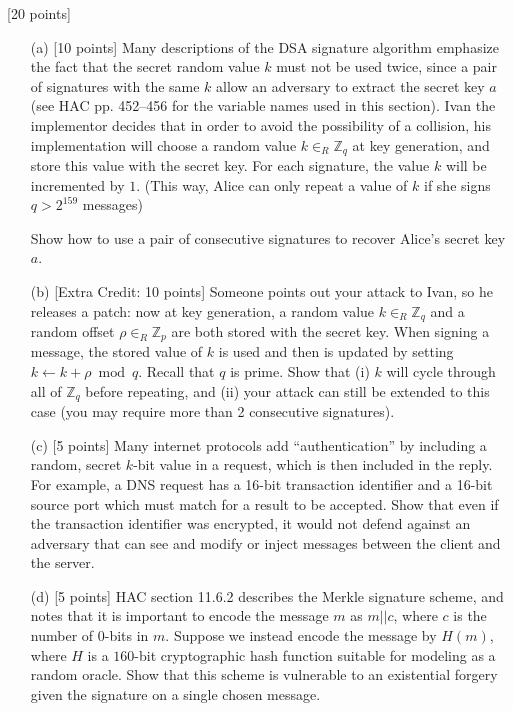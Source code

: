 \documentclass[11pt]{article}
\newcounter{qnum}
\newcommand{\question}[1]{\stepcounter{qnum}\bigskip\noindent{\bf \arabic{qnum}. #1.}}
\begin{document}
\question{Forged in the fires of CSELabs\dots} [20 points]
\begin{itemize}
\item[(a)] [10 points] Many descriptions of the DSA signature algorithm emphasize
  the fact that the secret random value $k$ must not be used twice,
  since a pair of signatures with the same $k$ allow an adversary to
  extract the secret key $a$  (see HAC pp. 452--456 for the variable
  names used in this section).  Ivan the implementor decides that in
  order to avoid the possibility of a collision, his implementation
  will choose a random value $k \in_R \mathbb{Z}_q$ at key generation,
  and store this value with the secret key.  For each signature, the
  value $k$ will be incremented by $1$.  (This way, Alice can only
  repeat a value of $k$ if she signs $q > 2^{159}$ messages)

  Show how to use a pair of consecutive signatures to recover Alice's
  secret key $a$.

\item[(b)] [Extra Credit: 10 points] Someone points out your attack to
  Ivan, so he releases a patch: now at key generation, a random value
  $k \in_R \mathbb{Z}_q$ and a random offset $\rho \in_R \mathbb{Z}_p$
  are both stored with the secret key.  When signing a message, the
  stored value of $k$ is used and then is updated by setting $k \gets
  k + \rho \bmod q$.  Recall that $q$ is prime.  Show that (i) $k$
  will cycle through all of $\mathbb{Z}_q$ before repeating, and (ii)
  your attack can still be extended to this case (you may require more
  than 2 consecutive signatures).

\item[(c)] [5 points] Many internet protocols add ``authentication''
  by including a random, secret $k$-bit value in a request, which is
  then included in the reply.  For example, a DNS request has a 16-bit
  transaction identifier and a 16-bit source port which must match for
  a result to be accepted.  Show that even if the transaction identifier was
  encrypted, it would not defend against an adversary that can see and
  modify or inject messages between the client and the server.

\item[(d)] [5 points] HAC section 11.6.2 describes the Merkle
  signature scheme, and notes that it is important to encode the
  message $m$ as $m||c$, where $c$ is the number of 0-bits in $m$.
  Suppose we instead encode the message by $H(m)$, where $H$ is a
  $160$-bit cryptographic hash function suitable for modeling as a random
  oracle.  Show that this scheme is vulnerable to an existential
  forgery given the signature on a single chosen message.
\end{itemize}
\end{document}
